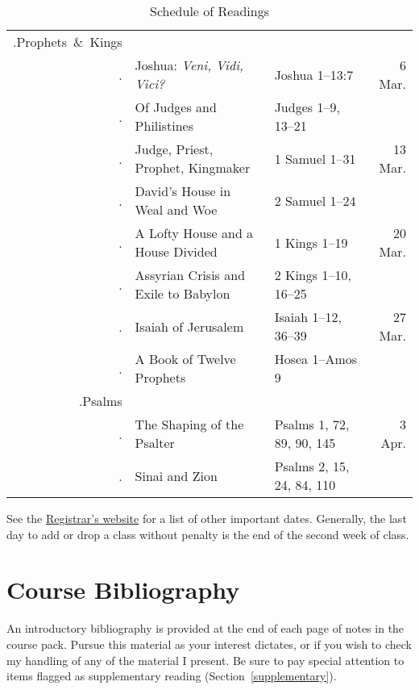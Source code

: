 \documentclass[titlepage]{article}
\begin{document}
\begin{table}[phtb]
\begin{tabular}{>{\sessioncount.}r@{ }llr}
    \unit{Prophets \& Kings}                                                                \\
          & Joshua: \emph{Veni, Vidi, Vici?}          & Joshua 1--13:7            &  6 Mar. \\
          & Of Judges and Philistines                 & Judges 1--9, 13--21       &         \\
          & Judge, Priest, Prophet, Kingmaker         & 1 Samuel 1--31            & 13 Mar. \\
          & David's House in Weal and Woe             & 2 Samuel 1--24            &         \\
          & A Lofty House and a House Divided         & 1 Kings 1--19             & 20 Mar. \\
          & Assyrian Crisis and Exile to Babylon      & 2 Kings 1--10, 16--25     &         \\
          & Isaiah of Jerusalem                       & Isaiah 1--12, 36--39      & 27 Mar. \\
          & A Book of Twelve Prophets                 & Hosea 1--Amos 9           &         \\ [1ex]
    \unit{Psalms}                                                                           \\
          & The Shaping of the Psalter                & Psalms 1, 72, 89, 90, 145 &  3 Apr. \\
          & Sinai and Zion                            & Psalms 2, 15, 24, 84, 110 &         \\
    \bottomrule
  \end{tabular}
  \caption{Schedule of Readings}
  \label{schedule}
\end{table}
See the \href{http://www.tyndale.ca/registrar/important-dates}{%
Registrar's website} for a list of other important dates. Generally, the
last day to add or drop a class without penalty is the end of the second
week of class.

\section{Course Bibliography}
\label{bibliography}

An introductory bibliography is provided at the end of each page
of notes in the course pack. Pursue this material as your interest
dictates, or if you wish to check my handling of any of the material
I present. Be sure to pay special attention to items flagged as
supplementary reading (Section~\ref{supplementary}).
\end{document}
